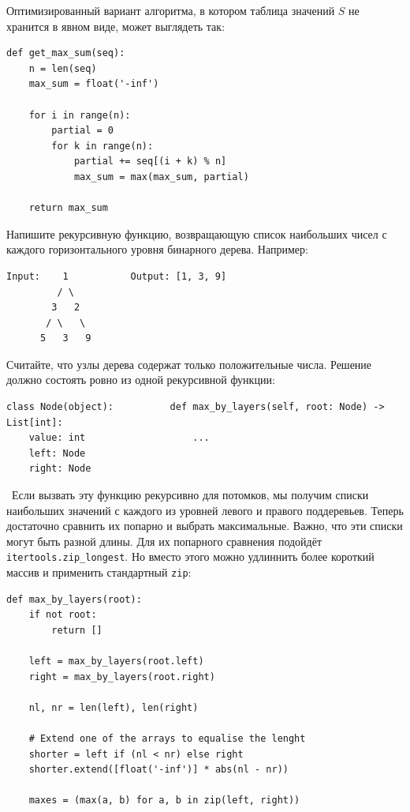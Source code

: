 \documentclass[12pt]{exam}
\begin{document}
\begin{questions}
\begin{solution}
Оптимизированный вариант алгоритма, в котором таблица значений $S$ не хранится в явном виде, может выглядеть так:
\begin{verbatim}
def get_max_sum(seq):
    n = len(seq)
    max_sum = float('-inf')
    
    for i in range(n):
        partial = 0
        for k in range(n):
            partial += seq[(i + k) % n]
            max_sum = max(max_sum, partial)

    return max_sum
\end{verbatim}


\end{solution}


\question[8] Напишите рекурсивную функцию, возвращающую список наибольших чисел с каждого горизонтального уровня бинарного дерева. Например:


\begin{verbatim}
Input:    1           Output: [1, 3, 9]
         / \
        3   2
       / \   \  
      5   3   9 
\end{verbatim}


Считайте, что узлы дерева содержат только положительные числа. Решение должно состоять ровно из одной рекурсивной функции:

\begin{verbatim}
class Node(object):          def max_by_layers(self, root: Node) -> List[int]:
    value: int                   ...
    left: Node
    right: Node
\end{verbatim}


\begin{solution} \
Если вызвать эту функцию рекурсивно для потомков, мы получим списки наибольших значений с каждого из уровней левого и правого поддеревьев. Теперь достаточно сравнить их попарно и выбрать максимальные. Важно, что эти списки могут быть разной длины. Для их попарного сравнения подойдёт {\tt itertools.zip\_longest}. Но вместо этого можно удлиннить более короткий массив и применить стандартный {\tt zip}:
\begin{verbatim}
def max_by_layers(root):
    if not root:
        return []

    left = max_by_layers(root.left)
    right = max_by_layers(root.right)

    nl, nr = len(left), len(right)

    # Extend one of the arrays to equalise the lenght
    shorter = left if (nl < nr) else right
    shorter.extend([float('-inf')] * abs(nl - nr))

    maxes = (max(a, b) for a, b in zip(left, right))


\end{verbatim}
\end{solution}
\end{questions}
\end{document}
